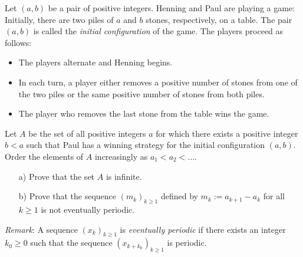 Let $(a,b)$ be a pair of positive integers.
Henning and Paul are playing a game:
Initially, there are two piles of $a$ and $b$ stones, respectively, on a table.
The pair $(a,b)$ is called the \textit{initial configuration} of the game.
The players proceed as follows:
\begin{itemize}
    \item The players alternate and Henning begins.
    \item In each turn, a player either removes a positive number of stones
    from one of the two piles or the same positive number of stones from both piles.
    \item The player who removes the last stone from the table wins the game.
\end{itemize} 
Let $A$ be the set of all positive integers $a$ for which there exists
a positive integer $b<a$ such that Paul has a winning strategy for the initial configuration $(a,b)$.
Order the elements of $A$ increasingly as $a_1<a_2<\ldots$.
\begin{enumerate}
    \item[a)] Prove that the set $A$ is infinite.
    \item[b)] Prove that the sequence $(m_k)_{k \geq 1}$ defined by $m_k := a_{k+1} - a_k$
    for all $k\geq 1$ is not eventually periodic.
\end{enumerate}

\textit{Remark}: A sequence $(x_k)_{k \geq 1}$ is \textit{eventually periodic} if
there exists an integer $k_0\geq 0$ such that the sequence $(x_{k+k_0})_{k\geq 1}$ is periodic.
